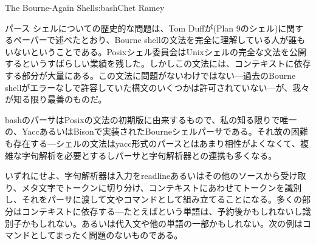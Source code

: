 \begin{aosachapter}{The Bourne-Again Shell}{s:bash}{Chet Ramey}
\begin{aosasect1}{パース}
シェルについての歴史的な問題は、Tom Duffが(Plan 9のシェル)に関するペーパーで述べたとおり、Bourne shellの文法を完全に理解している人が誰もいないということである。Posixシェル委員会はUnixシェルの完全な文法を公開するというすばらしい業績を残した。しかしこの文法には、コンテキストに依存する部分が大量にある。この文法に問題がないわけではない---過去のBourne shellがエラーなしで許容していた構文のいくつかは許可されていない---が、我々が知る限り最善のものだ。

bashのパーサはPosixの文法の初期版に由来するもので、私の知る限りで唯一の、YaccあるいはBisonで実装されたBourneシェルパーサである。それ故の困難も存在する---シェルの文法はyacc形式のパースとはあまり相性がよくなくて、複雑な字句解析を必要とするしパーサと字句解析器との連携も多くなる。

いずれにせよ、字句解析器は入力をreadlineあるいはその他のソースから受け取り、メタ文字でトークンに切り分け、コンテキストにあわせてトークンを識別し、それをパーサに渡して文やコマンドとして組み立てることになる。多くの部分はコンテキストに依存する---たとえばという単語は、予約後かもしれないし識別子かもしれない。あるいは代入文や他の単語の一部かもしれない。次の例はコマンドとしてまったく問題のないものである。


\end{aosasect1}
\end{aosachapter}
